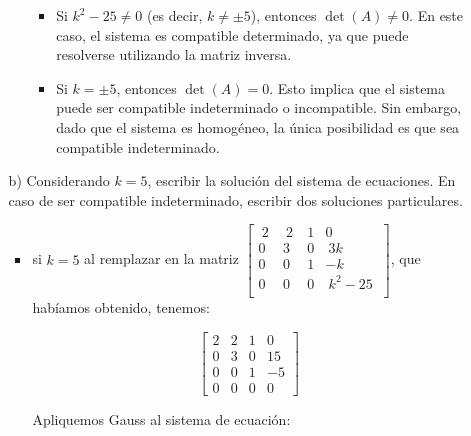 \documentclass[11pt]{article}
\begin{document}
\begin{enumerate}[\hspace{-5mm} 1) ]
\begin{enumerate}
\begin{itemize}
\begin{itemize}
    \item Si $k^2 - 25 \neq 0$ (es decir, $k \neq \pm 5$), entonces $\det(A) \neq 0$. En este caso, el sistema es compatible determinado, ya que puede resolverse utilizando la matriz inversa.
    \item Si $k = \pm 5$, entonces $\det(A) = 0$. Esto implica que el sistema puede ser compatible indeterminado o incompatible. Sin embargo, dado que el sistema es homogéneo, la única posibilidad es que sea compatible indeterminado.
\end{itemize}
    
\end{itemize}


















    
    \item[b)] Considerando $k = 5$, escribir la solución del sistema de ecuaciones. En caso de ser compatible indeterminado, escribir dos soluciones particulares.




    

\begin{itemize}
    \item si $k=5 $ al remplazar en la  matriz  $
    \left[\begin{smallmatrix}
\ 2 \ & \ 2\  & 1 & 0 \\[1mm]
0 & 3 & 0 & \  3k \  \\[1mm]
0 & 0 & 1 & -k \\[1mm]
0 & 0 & 0 &\  k^2 - 25\ \\
\end{smallmatrix}
\right]  
$, que habíamos obtenido, tenemos: 


    $$
    \left[\begin{array}{rrcc}
2 & 2 & 1 & 0 \\
0 & 3 & 0 & 15 \\
0 & 0 & 1 & -5\\
0 & 0 & 0 & 0
\end{array}
\right]  
$$

Apliquemos Gauss al sistema de ecuación: 


\end{itemize}
\end{enumerate}
\end{enumerate}
\end{document}
